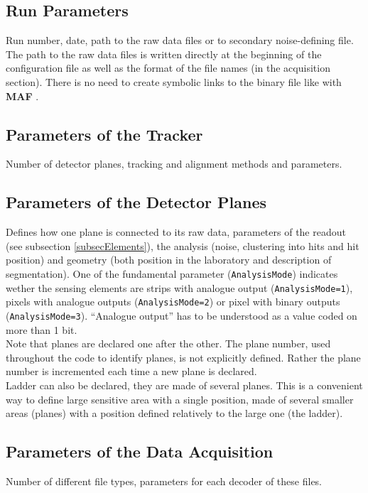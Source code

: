 \documentclass[a4paper, 12pt, twoside]{article}
\newcommand{\MAF}{{\bf MAF }}
\begin{document}
\subsection{Run Parameters}
Run number, date, path to the raw data files or to secondary noise-defining file.\\
The path to the raw data files is written directly at the beginning of the configuration file as well as the format of the file names (in the acquisition section). There is no need to create symbolic links to the binary file like with \MAF.

\subsection{Parameters of the Tracker}
Number of detector planes, tracking and alignment methods and parameters.

\subsection{Parameters of the Detector Planes}
Defines how one plane is connected to its raw data, parameters of the readout (see subsection \ref{subsecElements}), the analysis (noise, clustering into hits and hit position) and geometry (both position in the laboratory and description of segmentation). One of the fundamental parameter ({\tt AnalysisMode}) indicates wether the sensing elements are strips with analogue output ({\tt AnalysisMode=1}), pixels with analogue outputs ({\tt AnalysisMode=2}) or pixel with binary outputs ({\tt AnalysisMode=3}). ``Analogue output'' has to be understood as a value coded on more than 1 bit.\\ 

\noindent
Note that planes are declared one after the other. The plane number, used throughout the code to identify planes, is not explicitly defined. Rather the plane number is incremented each time a new plane is declared.\\
Ladder can also be declared, they are made of several planes. This is a convenient way to define large sensitive area with a single position, made of several smaller areas (planes) with a position defined relatively to the large one (the ladder).

\subsection{Parameters of the Data Acquisition}
Number of different file types, parameters for each decoder of these files.
\end{document}
